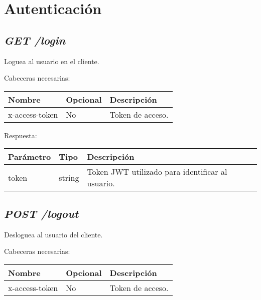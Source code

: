 \section{Autenticación}

\subsection{\textit{GET /login}}
Loguea al usuario en el cliente.

Cabeceras necesarias:
\begin{table}[h!]
	\centering
	\begin{adjustbox}{max width=\textwidth}
	\begin{tabular}{|l|l|l|}
		\hline
		Nombre & Opcional & Descripción \\ \hline
		x-access-token & No & Token de acceso. \\ \hline
	\end{tabular}
\end{adjustbox}
\end{table}


Respuesta:
\begin{table}[h!]
	\centering
	\begin{adjustbox}{max width=\textwidth}
	\begin{tabular}{|l|l|l|}
		\hline
		Parámetro & Tipo & Descripción \\ \hline
		token & string & Token JWT utilizado para identificar al usuario. \\ \hline
	\end{tabular}
\end{adjustbox}
\end{table}



\subsection{\textit{POST /logout}}

Desloguea al usuario del cliente.

\bigskip
Cabeceras necesarias:

\begin{table}[h!]
	\centering
\begin{adjustbox}{max width=\textwidth}
	\begin{tabular}{|l|l|l|}
		\hline
		Nombre & Opcional & Descripción \\ \hline
		x-access-token & No & Token de acceso. \\ \hline
	\end{tabular}
\end{adjustbox}
\end{table}


